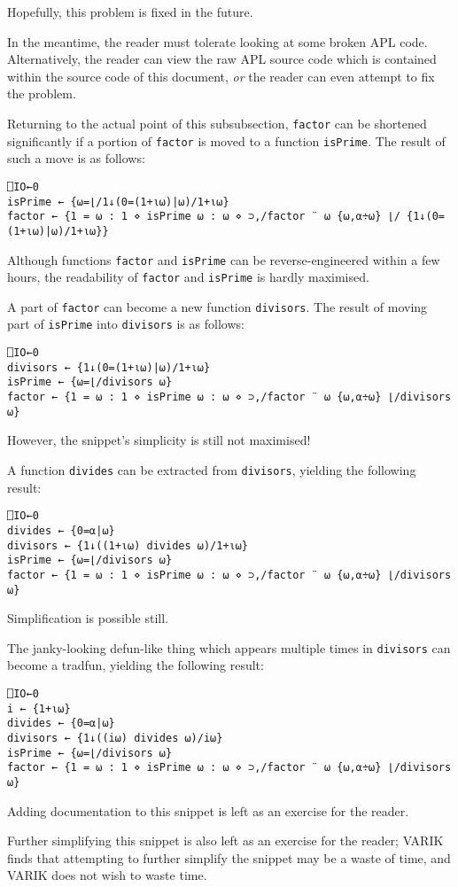 \documentclass{report}
\begin{document}
Hopefully, this problem is fixed in the future.

In the meantime, the reader must tolerate looking at some broken APL code.  Alternatively, the reader can view the raw APL source code which is contained within the source code of this document, \textit{or} the reader can even attempt to fix the problem.

Returning to the actual point of this subsubsection, \texttt{factor} can be shortened significantly if a portion of \texttt{factor} is moved to a function \texttt{isPrime}.  The result of such a move is as follows:
\begin{lstlisting}
⎕IO←0
isPrime ← {⍵=⌊/1↓(0=(1+⍳⍵)|⍵)/1+⍳⍵}
factor ← {1 = ⍵ : 1 ⋄ isPrime ⍵ : ⍵ ⋄ ⊃,/factor ¨ ⍵ {⍵,⍺÷⍵} ⌊/ {1↓(0=(1+⍳⍵)|⍵)/1+⍳⍵}}
\end{lstlisting}
Although functions \texttt{factor} and \texttt{isPrime} can be reverse-engineered within a few hours, the readability of \texttt{factor} and \texttt{isPrime} is hardly maximised.

A part of \texttt{factor} can become a new function \texttt{divisors}.  The result of moving part of \texttt{isPrime} into \texttt{divisors} is as follows:
\begin{lstlisting}
⎕IO←0
divisors ← {1↓(0=(1+⍳⍵)|⍵)/1+⍳⍵}
isPrime ← {⍵=⌊/divisors ⍵}
factor ← {1 = ⍵ : 1 ⋄ isPrime ⍵ : ⍵ ⋄ ⊃,/factor ¨ ⍵ {⍵,⍺÷⍵} ⌊/divisors ⍵}
\end{lstlisting}
However, the snippet's simplicity is still not maximised!

A function \texttt{divides} can be extracted from \texttt{divisors}, yielding the following result:
\begin{lstlisting}
⎕IO←0
divides ← {0=⍺|⍵}
divisors ← {1↓((1+⍳⍵) divides ⍵)/1+⍳⍵}
isPrime ← {⍵=⌊/divisors ⍵}
factor ← {1 = ⍵ : 1 ⋄ isPrime ⍵ : ⍵ ⋄ ⊃,/factor ¨ ⍵ {⍵,⍺÷⍵} ⌊/divisors ⍵}
\end{lstlisting}
Simplification is possible still.

The janky-looking defun-like thing which appears multiple times in \texttt{divisors} can become a tradfun, yielding the following result:
\begin{lstlisting}
⎕IO←0
i ← {1+⍳⍵}
divides ← {0=⍺|⍵}
divisors ← {1↓((i⍵) divides ⍵)/i⍵}
isPrime ← {⍵=⌊/divisors ⍵}
factor ← {1 = ⍵ : 1 ⋄ isPrime ⍵ : ⍵ ⋄ ⊃,/factor ¨ ⍵ {⍵,⍺÷⍵} ⌊/divisors ⍵}
\end{lstlisting}
Adding documentation to this snippet is left as an exercise for the reader.

Further simplifying this snippet is also left as an exercise for the reader; VARIK finds that attempting to further simplify the snippet may be a waste of time, and VARIK does not wish to waste time.
\end{document}
